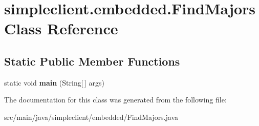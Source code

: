 \hypertarget{classsimpleclient_1_1embedded_1_1FindMajors}{}\section{simpleclient.\+embedded.\+Find\+Majors Class Reference}
\label{classsimpleclient_1_1embedded_1_1FindMajors}
\subsection*{Static Public Member Functions}
\begin{DoxyCompactItemize}
\item 
\mbox{\label{classsimpleclient_1_1embedded_1_1FindMajors_a967ebf9c878d9b499087a71b6032f997}} 
static void {\bfseries main} (String\mbox{[}$\,$\mbox{]} args)
\end{DoxyCompactItemize}


The documentation for this class was generated from the following file\+:\begin{DoxyCompactItemize}
\item 
src/main/java/simpleclient/embedded/Find\+Majors.\+java\end{DoxyCompactItemize}
